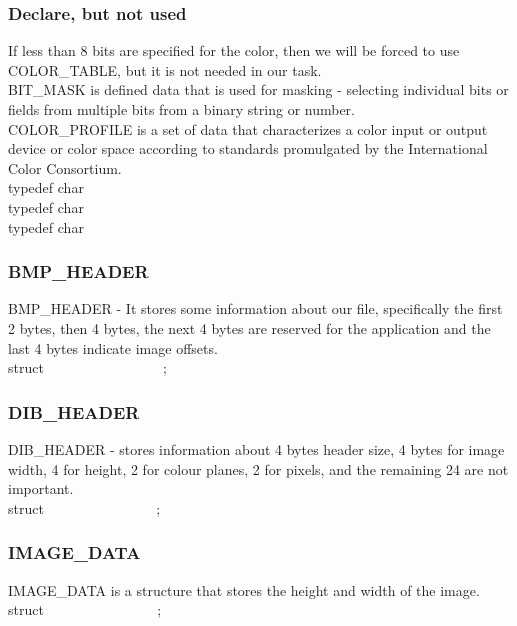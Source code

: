 \documentclass{article}
\begin{document}
\subsubsection{Declare, but not used}

If less than 8 bits are specified for the color, then we will be forced to use COLOR\_TABLE, but it is not needed in our task.
\\
BIT\_MASK is defined data that is used for masking - selecting individual bits or fields from multiple bits from a binary string or number.
\\
COLOR\_PROFILE is a set of data that characterizes a color input or output device or color space according to standards promulgated by the International Color Consortium.
\\[1\baselineskip]
\colorbox{black!80}{\textcolor{orange!65}{typedef char} \textcolor{white}{BIT\_MASKS\textcolor{orange!65}{;}}}
\\
\colorbox{black!80}{\textcolor{orange!65}{typedef char} \textcolor{white}{COLOR\_TABLE\textcolor{orange!65}{;}}}
\\
\colorbox{black!80}{\textcolor{orange!65}{typedef char} \textcolor{white}{COLOR\_PROFILE\textcolor{orange!65}{;}}}

\subsubsection{BMP\_HEADER}
BMP\_HEADER - It stores some information about our file, specifically the first 2 bytes, then 4 bytes, the next 4 bytes are reserved for the application and the last 4 bytes indicate image offsets.
\\[1\baselineskip]
\colorbox{black!80}{\textcolor{orange!65}{struct} \textcolor{white}{BMP\_HEADER\_}\textcolor{orange!65}{;}}
\subsubsection{DIB\_HEADER}
DIB\_HEADER - stores information about 4 bytes header size, 4 bytes for image width, 4 for height, 2 for colour planes, 2 for pixels, and the remaining 24 are not important.
\\[1\baselineskip]
\colorbox{black!80}{\textcolor{orange!65}{struct} \textcolor{white}{DIB\_HEADER\_}\textcolor{orange!65}{;}}
\subsubsection{IMAGE\_DATA}
IMAGE\_DATA is a structure that stores the height and width of the image.
\\[1\baselineskip]
\colorbox{black!80}{\textcolor{orange!65}{struct} \textcolor{white}{IMAGE\_DATA\_}\textcolor{orange!65}{;}}
\end{document}
